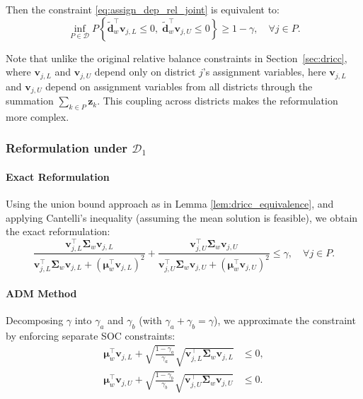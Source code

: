 \documentclass[preprint,12pt,authoryear]{elsarticle}
\begin{document}
Then the constraint \eqref{eq:assign_dep_rel_joint} is equivalent to:
\begin{equation}
\inf_{P \in \mathcal{D}} P \left\{ \widetilde{\mathbf{d}}_w^\top \mathbf{v}_{j,L} \leqslant 0, \; \widetilde{\mathbf{d}}_w^\top \mathbf{v}_{j,U} \leqslant 0 \right\} \geqslant 1 - \gamma, \quad \forall j \in P.
\label{eq:assign_dep_rel_joint_rewritten}
\end{equation}

Note that unlike the original relative balance constraints in Section~\ref{sec:dricc}, where $\mathbf{v}_{j,L}$ and $\mathbf{v}_{j,U}$ depend only on district $j$'s assignment variables, here $\mathbf{v}_{j,L}$ and $\mathbf{v}_{j,U}$ depend on assignment variables from all districts through the summation $\sum_{k \in P} \mathbf{z}_k$. This coupling across districts makes the reformulation more complex.

\subsubsection{Reformulation under $\mathcal{D}_1$}

\paragraph{Exact Reformulation}
Using the union bound approach as in Lemma \ref{lem:dricc_equivalence}, and applying Cantelli's inequality (assuming the mean solution is feasible), we obtain the exact reformulation:
\begin{equation}
\frac{\mathbf{v}_{j,L}^\top \boldsymbol{\Sigma}_w \mathbf{v}_{j,L}}{\mathbf{v}_{j,L}^\top \boldsymbol{\Sigma}_w \mathbf{v}_{j,L} + (\boldsymbol{\mu}_w^\top \mathbf{v}_{j,L})^2} + \frac{\mathbf{v}_{j,U}^\top \boldsymbol{\Sigma}_w \mathbf{v}_{j,U}}{\mathbf{v}_{j,U}^\top \boldsymbol{\Sigma}_w \mathbf{v}_{j,U} + (\boldsymbol{\mu}_w^\top \mathbf{v}_{j,U})^2} \leqslant \gamma, \quad \forall j \in P.
\label{eq:assign_dep_rel_balance_d1_exact}
\end{equation}

\paragraph{ADM Method}
Decomposing $\gamma$ into $\gamma_a$ and $\gamma_b$ (with $\gamma_a + \gamma_b = \gamma$), we approximate the constraint by enforcing separate SOC constraints:
\begin{align}
\boldsymbol{\mu}_w^\top \mathbf{v}_{j,L} + \sqrt{\frac{1-\gamma_a}{\gamma_a}} \sqrt{\mathbf{v}_{j,L}^\top \boldsymbol{\Sigma}_w \mathbf{v}_{j,L}} &\leqslant 0, \label{eq:assign_dep_rel_balance_d1_adm_lower} \\
\boldsymbol{\mu}_w^\top \mathbf{v}_{j,U} + \sqrt{\frac{1-\gamma_b}{\gamma_b}} \sqrt{\mathbf{v}_{j,U}^\top \boldsymbol{\Sigma}_w \mathbf{v}_{j,U}} &\leqslant 0. \label{eq:assign_dep_rel_balance_d1_adm_upper}
\end{align}
\end{document}
